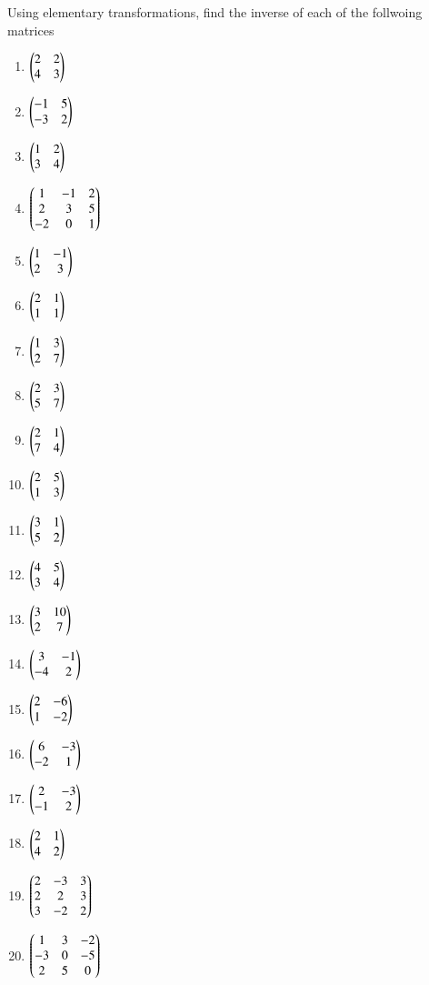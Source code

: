 Using elementary transformations, find the inverse of each of the follwoing matrices
\begin{enumerate}[label=\thesubsection.\arabic*,ref=\thesubsection.\theenumi]
\item $\begin{pmatrix}2 & 2 \\ 4 & 3\end{pmatrix}$ \label{prob:5}
\item $\begin{pmatrix}-1 & 5 \\ -3 & 2\end{pmatrix}$
\item $\begin{pmatrix}1 & 2 \\ 3 & 4\end{pmatrix}$ \label{prob:1}
\item $\begin{pmatrix}1 & -1 & 2 \\ 2 & 3 & 5 \\ -2 & 0 & 1\end{pmatrix}$ \label{prob:2}
\item $\begin{pmatrix}1 & -1 \\ 2 & 3\end{pmatrix}$ 
\item $\begin{pmatrix}2 & 1 \\ 1 & 1\end{pmatrix}$
\item $\begin{pmatrix}1 & 3 \\ 2 & 7\end{pmatrix}$
\item $\begin{pmatrix}2 & 3 \\ 5 & 7\end{pmatrix}$
\item $\begin{pmatrix}2 & 1 \\ 7 & 4\end{pmatrix}$
\item $\begin{pmatrix}2 & 5 \\ 1 & 3\end{pmatrix}$
\item $\begin{pmatrix}3 & 1 \\ 5 & 2\end{pmatrix}$
\item $\begin{pmatrix}4 & 5 \\ 3 & 4\end{pmatrix}$
\item $\begin{pmatrix}3 & 10 \\ 2 & 7\end{pmatrix}$
\item $\begin{pmatrix}3 & -1 \\ -4 & 2\end{pmatrix}$
\item $\begin{pmatrix}2 & -6 \\ 1 & -2\end{pmatrix}$
\item $\begin{pmatrix}6 & -3 \\ -2 & 1\end{pmatrix}$
\item $\begin{pmatrix}2 & -3 \\ -1 & 2\end{pmatrix}$
\item $\begin{pmatrix}2 & 1 \\ 4 & 2\end{pmatrix}$
\item $\begin{pmatrix}2 & -3 & 3 \\ 2 & 2 & 3 \\ 3 & -2 & 2\end{pmatrix}$
\item $\begin{pmatrix}1 & 3 & -2 \\ -3 & 0 & -5 \\ 2 & 5 & 0\end{pmatrix}$  

\end{enumerate}
